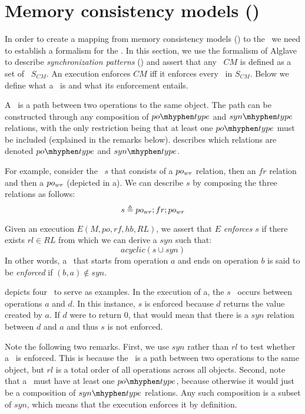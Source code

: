 \section{Memory consistency models (\mcms)}\label{sec:cons}
In order to create a mapping from memory consistency models (\mcms) to the \rts\ we need to establish a formalism for the \mcms. In this section, we use the formalism of Alglave \etal\cite{Alglave:2014} to describe \emph{synchronization patterns} (\synpats) and assert that any \mcm\ $CM$ is defined as a set of \synpats\ $S_{CM}$. An execution enforces $CM$ iff it enforces every \synpat\ in $S_{CM}$.
Below we define what a \synpat\ is and what its enforcement entails. 





A \synpat\ is a path between two operations to the same object. The path can be constructed through any composition of $\potype$ and $\syntype$ relations, with the only restriction being that at least one $\potype$ must be included (explained in the remarks below).
 describes which relations are denoted $\potype$ and $\syntype$.

For example, consider the \synpat\ $s$ that consists of a $po_{wr}$ relation, then an $fr$ relation and then a $po_{wr}$ (depicted in a).
We can describe $s$ by composing the three relations as follows:
\begin{equation*}
    s \triangleq po_{wr} ; fr ; po_{wr}
\end{equation*}

Given an execution $E (M, po, rf, hb, RL)$, we assert that $E$ \emph{enforces} $s$ if there exists $rl \in RL$ from which we can derive a $syn$ such that:
\begin{equation*}
    acyclic(s \cup syn)
\end{equation*}
In other words, a \synpat\ that starts from operation $a$ and ends on operation $b$ is said to be \emph{enforced} if $(b, a) \notin syn$.  


 depicts four \synpats\ to serve as examples.
In the execution of a, the $s$ \synpat\ occurs between 
operations $a$ and  $d$. In this instance, $s$ is enforced because $d$ returns the value created by $a$.
If $d$ were to return $0$, that would mean that there is a $syn$ relation between $d$ and $a$ and thus $s$ is not enforced.

Note the following two remarks. 
First, we use $syn$ rather than $rl$ to test whether a \synpat\ is enforced. This is because the \synpat\ is a path between two operations to the same object, but $rl$ is a total order of all operations across all objects.
Second, note that a \synpat\ must have at least one $\potype$, because otherwise it would just be a composition of $\syntype$ relations. Any such composition is a subset of $syn$, which means that the execution enforces it by definition.

